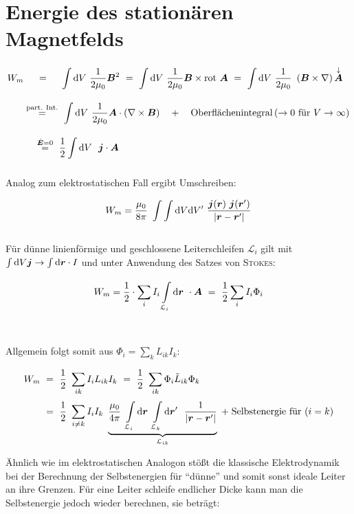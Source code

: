 \section{Energie des stationären Magnetfelds}

\begin{align*}
W_m & \ \quad = \quad  \ \Int{}{}{V}\frac{1}{2\mu_0}\vec{B}^2 \ =  \ \Int{}{}{V} \frac{1}{2\mu_0} \vec{B}\times\rot\vec{A} \ = \ \Int{}{}{V} \frac{1}{2\mu_0} \ \left(\vec{B}\times\nabla\right) \overset{\downarrow}{\vec{A}}\\
& \overset{\text{part. Int.}}{=}  \  \Int{}{}{V} \frac{1}{2\mu_0} \vec{A} \cdot\left(\nabla\times\vec{B}\right) \quad + \quad \text{Oberflächenintegral} \left(\rightarrow 0 \text{ für } V \rightarrow \infty\right)\\
& \;\;\;\;\overset{\dot{\vec{E}}=0}{=} \ \frac{1}{2} \Int{}{}{V} \ \vec{j}\cdot\vec{A}
\end{align*}

Analog zum elektrostatischen Fall ergibt Umschreiben:

\begin{equation*}
W_m = \frac{\mu_0}{8\pi} \ \int\int\d V \d V' \ \frac{\vec{j}(\vec{r}) \ \vec{j}(\vec{r}')}{|\vec{r}-\vec{r}'|}
\end{equation*}
\ \\

Für dünne linienförmige und geschlossene Leiterschleifen $\mathcal{L}_i$ gilt mit $\int\mathrm{d} V\bm{j} \rightarrow \int\mathrm{d} \bm{r} \cdot I$ und unter Anwendung des Satzes von \textsc{Stokes}:

\begin{equation*}
W_m = \frac{1}{2} \cdot \sum_i I_i \int\limits_{{\mathcal{L}_i}}^{{}}\mathrm{d}{\bm{r}}\  \cdot \bm{A} \ = \ \frac{1}{2} \sum_i I_i \Phi_i
\end{equation*}
\ \\
\ \\
Allgemein folgt somit aus $\Phi_i = \sum_k L_{ik} I_k$:

\begin{align*}
W_m \ &= \ \frac{1}{2} \ \sum_{ik}  I_i L_{ik} I_k \ = \ \frac{1}{2} \ \sum_{ik} \Phi_i \tilde{L}_{ik} \Phi_k\\
&= \ \frac{1}{2} \ \sum_{i\neq k} I_i I_k \ \underbrace{\frac{\mu_0}{4\pi} \ \Int{\mathcal{L}_i}{}{\vec{r}} \Int{\mathcal{L}_k}{}{\vec{r}'} \ \frac{1}{|\vec{r}-\vec{r}'|}}_{\mathcal{L}_{ik}} \; + \; \text{Selbstenergie für } (i=k)
\end{align*}

Ähnlich wie im elektrostatischen Analogon stößt die klassische Elektrodynamik bei der Berechnung der Selbstenergien für ``dünne'' und somit sonst ideale Leiter an ihre Grenzen. Für eine Leiter schleife endlicher Dicke kann man die Selbstenergie jedoch wieder berechnen, sie beträgt:

